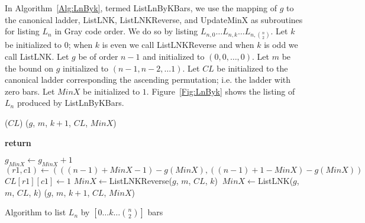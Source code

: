 In Algorithm~\ref{Alg:LnByk}, termed {\sc ListLnByKBars}, we use the mapping of $g$ to the canonical ladder, 
{\sc ListLNK}, {\sc ListLNKReverse}, and {\sc UpdateMinX} as subroutines 
for listing $L_{n}$ in Gray code order. We do so by listing 
$L_{n, 0} \dots L_{n, k} \dots L_{n, {n \choose 2}}$. Let $k$ be initialized to $0$; when $k$ is even we call {\sc ListLNKReverse} 
and when $k$ is odd we call {\sc ListLNK}. Let $g$ be of order $n-1$ and initialized to $(0,0, \dots ,0)$. 
Let $m$ be the bound on $g$ initialized to $(n-1, n-2, \dots 1)$. Let $CL$ be initialized to the canonical ladder 
corresponding the ascending permutation; i.e. the ladder with zero bars. Let $MinX$ be initialized to $1$. 
Figure~\ref{Fig:LnByk} shows the listing of $L_{n}$ produced by {\sc ListLnByKBars}.
\begin{algorithm}[ht]
  \begin{algorithmic}[1]
        ($CL$)
        ($g$, $m$, $k+1$, $CL$, $MinX$)
      \EndIf

       \textbf{return}
      \EndIf

      \State $g_{MinX} \gets g_{MinX}+1$
      \State $(r1,c1) \gets (((n-1)+MinX-1)-g(MinX), ((n-1)+1-MinX)-g(MinX))$
      \State $CL[r1][c1] \gets 1$
       $MinX \gets${\sc ListLNKReverse}($g$, $m$, $CL$, $k$)
      \Else $\: MinX \gets${\sc ListLNK}($g$, $m$, $CL$, $k$)
      \EndIf  
      ($g$, $m$, $k+1$, $CL$, $MinX$)

    \EndFunction
  \end{algorithmic}
  \caption{Algorithm to list $L_{n}$ by $[0 \dots k \dots {n \choose 2}]$ bars}
  \label{Alg:LnByk}
\end{algorithm}

